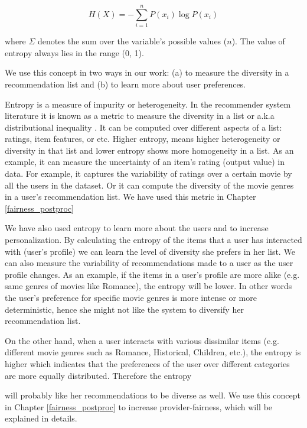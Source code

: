          \begin{equation}
            H(X)=-\sum_{i=1}^{n}P(x_{i})\log P(x_{i})
         \end{equation}

        where $\Sigma$ denotes the sum over the variable's possible values ($n$). The value of entropy always lies in the range (0, 1).
        
        We use this concept in two ways in our work: (a) to measure the diversity in a recommendation list and (b) to learn more about user preferences.
        
        Entropy is a measure of impurity or heterogeneity. In the recommender system literature it is known as a metric to measure the diversity in a list or a.k.a distributional inequality . It can be computed over different aspects of a list: ratings, item features, or etc.
        Higher entropy, means higher heterogeneity or diversity in that list and lower entropy shows more homogeneity in a list. As an example, it can measure the uncertainty of an item’s rating (output value) in data. For example, it captures the variability of ratings over a certain movie by all the users in the dataset. Or it can compute the diversity of the movie genres in a user's recommendation list. We have used this metric in Chapter \ref{fairness_postproc} 
        
        We have also used entropy to learn more about the users and to increase personalization. By calculating the entropy of the items that a user has interacted with (user's profile) we can learn the level of diversity she prefers in her list. We can also measure the variability of recommendations made to a user as the user profile changes. 
        As an example, if the items in a user's profile are more alike (e.g. same genres of movies like Romance), the entropy will be lower. In other words the user's preference for specific movie genres is more intense or more deterministic, hence she might not like the system to diversify her recommendation list.
        
        On the other hand, when a user interacts with various dissimilar items (e.g. different movie genres such as Romance, Historical, Children, etc.), the entropy is higher which indicates that the preferences of the user over different categories are more equally distributed. Therefore the entropy
        
        will probably like her recommendations to be diverse as well. We use this concept in Chapter \ref{fairness_postproc} to increase provider-fairness, which will be explained in details.
        
